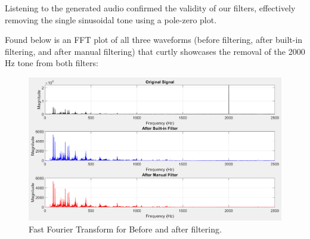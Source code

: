 \documentclass{article}
\begin{document}
Listening to the generated audio confirmed the validity of our filters, effectively removing the single sinusoidal tone using a pole-zero plot. 

Found below is an FFT plot of all three waveforms (before filtering, after built-in filtering, and after manual filtering) that curtly showcases the removal of the 2000 Hz tone from both filters:
\begin{figure}[h]
    \centering
    \includegraphics[width=0.9\linewidth]{before_and_after_filtering_fft.png}
    \caption{Fast Fourier Transform for Before and after filtering.}
    \label{fig:before_after_filtering}
\end{figure}
\end{document}
